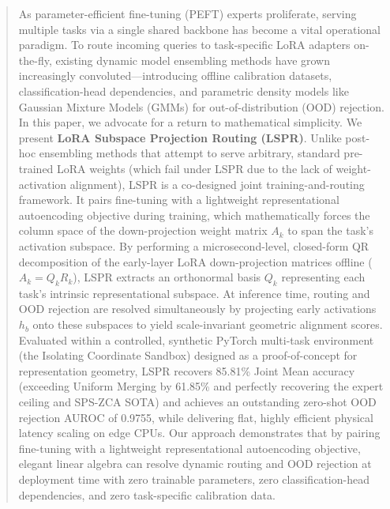 \begin{abstract}
As parameter-efficient fine-tuning (PEFT) experts proliferate, serving multiple
tasks via a single shared backbone has become a vital operational paradigm. To
route incoming queries to task-specific LoRA adapters on-the-fly, existing
dynamic model ensembling methods have grown increasingly convoluted—introducing
offline calibration datasets, classification-head dependencies, and parametric
density models like Gaussian Mixture Models (GMMs) for out-of-distribution (OOD)
rejection. In this paper, we advocate for a return to mathematical simplicity.
We present \textbf{LoRA Subspace Projection Routing (LSPR)}. Unlike post-hoc ensembling methods that attempt to serve arbitrary, standard pre-trained LoRA weights (which fail under LSPR due to the lack of weight-activation alignment), LSPR is a co-designed joint training-and-routing framework. It pairs fine-tuning with a lightweight representational autoencoding objective during training, which mathematically forces the column space of the down-projection weight matrix $A_k$ to span the task's activation subspace. By performing a microsecond-level, closed-form QR
decomposition of the early-layer LoRA down-projection matrices offline ($A_k =
Q_k R_k$), LSPR extracts an orthonormal basis $Q_k$ representing each task's
intrinsic representational subspace. At inference time, routing and OOD
rejection are resolved simultaneously by projecting early activations $h_b$ onto
these subspaces to yield scale-invariant geometric alignment scores. Evaluated
within a controlled, synthetic PyTorch multi-task environment (the Isolating
Coordinate Sandbox) designed as a proof-of-concept for representation geometry,
LSPR recovers 85.81\% Joint Mean accuracy (exceeding Uniform Merging by 61.85\% and perfectly recovering the expert ceiling and SPS-ZCA SOTA) and achieves an outstanding zero-shot OOD rejection AUROC of 0.9755, while delivering flat, highly efficient physical latency scaling on edge
CPUs. Our approach demonstrates that by pairing
fine-tuning with a lightweight representational autoencoding objective, elegant
linear algebra can resolve dynamic routing and OOD rejection at deployment time
with zero trainable parameters, zero classification-head dependencies, and zero task-specific calibration data.
\end{abstract}
